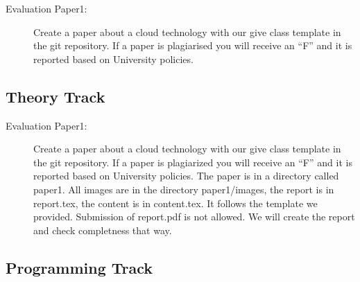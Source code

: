 \begin{itemize}


\begin{description}
\item[Evaluation Paper1:] Create a paper about a cloud technology with
  our give class template in the git repository. If a paper is
  plagiarised you will receive an ``F'' and it is reported based on
  University policies.
\end{description}


\subsection{Theory Track}



\begin{description}
\item[Evaluation Paper1:] Create a paper about a cloud technology with
  our give class template in the git repository. If a paper is
  plagiarized you will receive an ``F'' and it is reported based on
  University policies. The paper is in a directory called paper1. All
  images are in the directory paper1/images, the report is in
  report.tex, the content is in content.tex. It follows the template
  we provided. Submission of report.pdf is not allowed. We will create
  the report and check completness that way.
\end{description}

\subsection{Programming Track}


\end{itemize}
